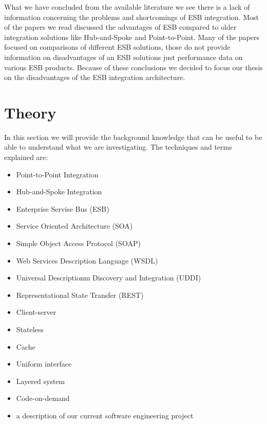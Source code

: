 \documentclass{llncs}
\begin{document}
What we have concluded from the available literature we see there is a lack of information concerning the problems and shortcomings of ESB integration.
Most of the papers we read discussed the advantages of ESB compared to older integration solutions like Hub-and-Spoke and Point-to-Point. Many of the papers focused on comparisons of different ESB solutions, those do not provide information on disadvantages of an ESB solutions just performance data on various ESB products. Because of these conclusions we decided to focus our thesis on the disadvantages of the ESB integration architecture.

\section{Theory}
In this section we will provide the background knowledge that can be useful to be able to understand what we are investigating.
The techniques and terms explained are:
\begin{itemize}
\item Point-to-Point Integration
\item Hub-and-Spoke Integration
\item Enterprise Servise Bus (ESB)
\item Service Oriented Architecture (SOA)
\item Simple Object Access Protocol (SOAP)
\item Web Services Description Language (WSDL)
\item Universal Descriptionm Discovery and Integration (UDDI)
\item Representational State Transfer (REST)
\item Client-server
\item Stateless
\item Cache
\item Uniform interface
\item Layered system
\item Code-on-demand
\item a description of our current software engineering project
\end{itemize}

\label{sec:background}
\end{document}
